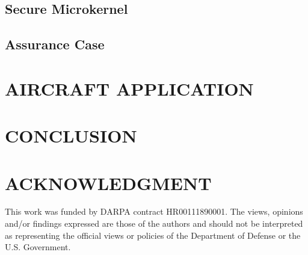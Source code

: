 \documentclass{IEEEcsmag}
\begin{document}
\subsection{Secure Microkernel}


\subsection{Assurance Case}


\section{AIRCRAFT APPLICATION}


\section{CONCLUSION}


\section{ACKNOWLEDGMENT}

This work was funded by DARPA contract HR00111890001. The
views, opinions and/or findings expressed are those of the authors
and should not be interpreted as representing the official views or
policies of the Department of Defense or the U.S. Government.





\end{document}
